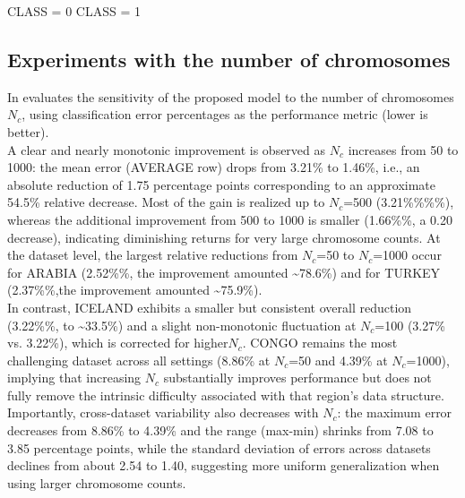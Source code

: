 \documentclass[12pt]{Definitions/academia}
\begin{document}
\begin{algorithm}[H]
	\caption{An example of classification program for the Greece dataset}
	\label{alg:An-example-of}
	\begin{algorithmic}[1]
		
		\State CLASS = 0
		\Else
		\State CLASS = 1
		\EndIf
		
	\end{algorithmic}
\end{algorithm}




\clearpage

\subsection{\textmd{Experiments with the number of chromosomes}}

In  evaluates the sensitivity
of the proposed model to the number of chromosomes $N_{c}$, using
classification error percentages as the performance metric (lower
is better).\\ A clear and nearly monotonic improvement is observed as
$N_{c}$ increases from 50 to 1000: the mean error (AVERAGE row) drops
from 3.21\% to 1.46\%, i.e., an absolute reduction of 1.75 percentage
points corresponding to an approximate 54.5\% relative decrease. Most
of the gain is realized up to $N_{c}$=500 (3.21\%\%\%\%),
whereas the additional improvement from 500 to 1000 is smaller (1.66\%\%,
a 0.20 decrease), indicating diminishing returns for very large chromosome
counts. At the dataset level, the largest relative reductions from
$N_{c}$=50 to $N_{c}$=1000 occur for ARABIA (2.52\%\%, the improvement amounted
\textasciitilde 78.6\%) and for TURKEY (2.37\%\%,the improvement amounted
\textasciitilde 75.9\%).\\ In contrast, ICELAND exhibits a smaller
but consistent overall reduction (3.22\%\%, to \textasciitilde 33.5\%)
and a slight non-monotonic fluctuation at $N_{c}$=100 (3.27\% vs.
3.22\%), which is corrected for higher$N_{c}$. CONGO remains the
most challenging dataset across all settings (8.86\% at $N_{c}$=50
and 4.39\% at $N_{c}$=1000), implying that increasing $N_{c}$ substantially
improves performance but does not fully remove the intrinsic difficulty
associated with that region\textquoteright s data structure. \\ Importantly,
cross-dataset variability also decreases with $N_{c}$: the maximum
error decreases from 8.86\% to 4.39\% and the range (max-min) shrinks
from 7.08 to 3.85 percentage points, while the standard deviation
of errors across datasets declines from about 2.54 to 1.40, suggesting
more uniform generalization when using larger chromosome counts.
\end{document}
